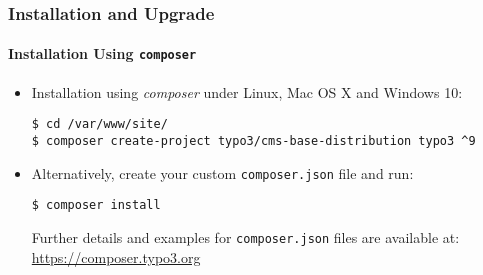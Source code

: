 
\begin{frame}[fragile]
	\frametitle{Installation and Upgrade}
	\framesubtitle{Installation Using \texttt{composer}}

	\begin{itemize}
		\item Installation using \textit{composer} under Linux, Mac OS X and Windows 10:

			\begin{lstlisting}
$ cd /var/www/site/
$ composer create-project typo3/cms-base-distribution typo3 ^9
			\end{lstlisting}

		\item Alternatively, create your custom \texttt{composer.json} file and run:

			\begin{lstlisting}
$ composer install
			\end{lstlisting}

			Further details and examples for \texttt{composer.json} files are available at:\newline
			\smaller
				\href{https://composer.typo3.org}{https://composer.typo3.org}
			\normalsize

	\end{itemize}
\end{frame}

